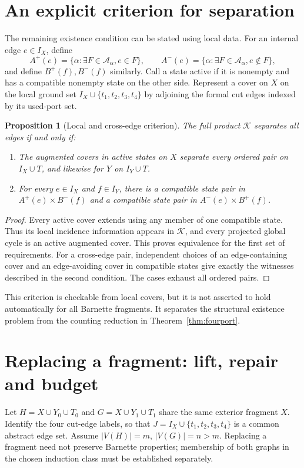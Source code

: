 \documentclass[10pt]{article}
\newtheorem{proposition}[theorem]{Proposition}
\begin{document}
\section{An explicit criterion for separation}
The remaining existence condition can be stated using local data. For an
internal edge $e\in I_X$, define
\[
 A^+(e)=\{\alpha:\exists F\in\mathcal A_\alpha, e\in F\},\qquad
 A^-(e)=\{\alpha:\exists F\in\mathcal A_\alpha, e\notin F\},
\]
and define $B^+(f),B^-(f)$ similarly. Call a state active if it is nonempty
and has a compatible nonempty state on the other side. Represent a cover on
$X$ on the local ground set $I_X\cup\{t_1,t_2,t_3,t_4\}$ by adjoining
the formal cut edges indexed by its used-port set.

\begin{proposition}[Local and cross-edge criterion]\label{prop:criterion}
The full product $\mathcal K$ separates all edges if and only if:
\begin{enumerate}
\item The augmented covers in active states on $X$ separate every ordered
pair on $I_X\cup T$, and likewise for $Y$ on $I_Y\cup T$.
\item For every $e\in I_X$ and $f\in I_Y$, there is a compatible state pair
in $A^+(e)\times B^-(f)$ and a compatible state pair in
$A^-(e)\times B^+(f)$.
\end{enumerate}
\end{proposition}
\begin{proof}
Every active cover extends using any member of one compatible state. Thus
its local incidence information appears in $\mathcal K$, and every projected
global cycle is an active augmented cover. This proves equivalence for the
first set of requirements. For a cross-edge pair, independent choices of
an edge-containing cover and an edge-avoiding cover in compatible states
give exactly the witnesses described in the second condition. The cases
exhaust all ordered pairs.
\end{proof}

This criterion is checkable from local covers, but it is not asserted to
hold automatically for all Barnette fragments. It separates the structural
existence problem from the counting reduction in Theorem~\ref{thm:fourport}.

\section{Replacing a fragment: lift, repair and budget}
Let $H=X\cup Y_0\cup T_0$ and $G=X\cup Y_1\cup T_1$ share the same exterior
fragment $X$. Identify the four cut-edge labels, so that
$J=I_X\cup\{t_1,t_2,t_3,t_4\}$ is a common abstract edge set. Assume
$|V(H)|=m$, $|V(G)|=n>m$. Replacing a fragment need not preserve Barnette
properties; membership of both graphs in the chosen induction class must
be established separately.
\end{document}
